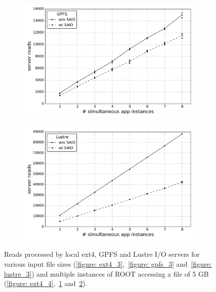 \begin{figure}[!htb]
\begin{subfigure}[b]{0.32\textwidth}
    \includegraphics[width=\textwidth]{chapters/chapter2/figures/SC2015/ROOT/cluster/multiple_instances/reads_simult_instance_gpfs_test_cluster}
    \caption{\textit{}}
    \label{figure: gpfs_4}
  \end{subfigure}
  \begin{subfigure}[b]{0.32\textwidth}
    \centering
    \includegraphics[width=\textwidth]{chapters/chapter2/figures/SC2015/ROOT/cluster/multiple_instances/reads_multiple_simult_procs_Lustre_testcluster}
    \caption{\textit{}}
    \label{figure: lustre_4}
  \end{subfigure}
  \caption{Reads processed by local ext4, GPFS and Lustre I/O servers for various input file sizes (\ref{figure: ext4_3},~\ref{figure: gpfs_3} and~\ref{figure: lustre_3}) and multiple instances of ROOT accessing a file of 5 GB (\ref{figure: ext4_4},~\ref{figure: gpfs_4} and~\ref{figure: lustre_4}).}
  \label{figure: read}
\end{figure}

